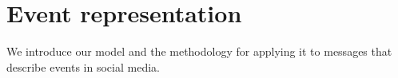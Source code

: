 \section{Event representation}\label{sec:model}

We introduce our model and the methodology for applying it to messages that
describe events in social media.





